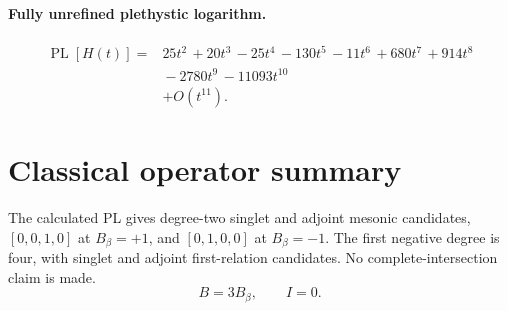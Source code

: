 \documentclass[10pt]{article}
\begin{document}
\paragraph{Fully unrefined plethystic logarithm.}
\[
\begin{aligned}
\operatorname{PL}[H(t)] ={}& 25t^{2}\,+20t^{3}\,-25t^{4}\,-130t^{5}\,-11t^{6}\,+680t^{7}\,+914t^{8} \\
  &{}-2780t^{9}\,-11093t^{10} \\
  &+ O(t^{11}).
\end{aligned}
\]
\section{Classical operator summary}
The calculated PL gives degree-two singlet and adjoint mesonic candidates,
$[0,0,1,0]$ at $B_\beta=+1$, and $[0,1,0,0]$ at $B_\beta=-1$.
The first negative degree is four, with singlet and adjoint first-relation
candidates. No complete-intersection claim is made.
\[B=3B_\beta,\qquad I=0.\]
\end{document}
